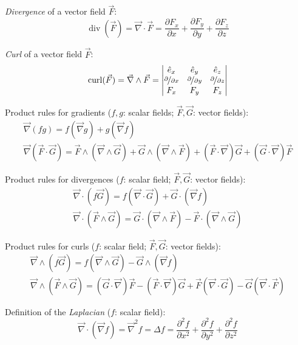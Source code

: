 \documentclass[fontsize=11pt,a4paper]{scrartcl}
\DeclareMathOperator{\Div}{div}
\DeclareMathOperator{\curl}{curl}
\begin{document}
\emph{Divergence} of a vector field $\vec F$:
\[
	\Div(\vec F) = \vec\nabla\cdot\vec F = \frac{\partial F_x}{\partial x}
	                                       + \frac{\partial F_y}{\partial y}
	                                       + \frac{\partial F_z}{\partial z}
\]

\emph{Curl} of a vector field $\vec F$:
\[
	\curl(\vec F) = \vec\nabla\wedge\vec F = \begin{vmatrix}\hat e_x & \hat e_y & \hat e_z\\
	                                                        \nicefrac{\partial}{\partial x} & \nicefrac{\partial}{\partial y} & \nicefrac{\partial}{\partial z}\\
	                                                        F_x & F_y & F_z
	                                         \end{vmatrix}
\]

Product rules for gradients ($f,g$: scalar fields; $\vec F,\vec G$: vector fields):
\begin{gather*}
	\vec\nabla(fg) = f(\vec\nabla g) + g(\vec\nabla f)\\
	\vec\nabla(\vec F\cdot\vec G) = \vec F\wedge(\vec\nabla\wedge\vec G) + \vec G\wedge(\vec\nabla\wedge\vec F)
	                               +(\vec F\cdot\vec\nabla)\vec G + (\vec G\cdot\vec\nabla)\vec F
\end{gather*}

Product rules for divergences ($f$: scalar field; $\vec F,\vec G$: vector fields):
\begin{gather*}
	\vec\nabla\cdot(f\vec G) = f(\vec\nabla\cdot\vec G) + \vec G\cdot(\vec\nabla f)\\
	\vec\nabla\cdot(\vec F\wedge\vec G) = \vec G\cdot(\vec\nabla\wedge\vec F) - \vec F\cdot(\vec\nabla\wedge\vec G)
\end{gather*}

Product rules for curls ($f$: scalar field; $\vec F,\vec G$: vector fields):
\begin{gather*}
	\vec\nabla\wedge(f\vec G) = f(\vec\nabla\wedge\vec G) - \vec G\wedge(\vec\nabla f)\\
	\vec\nabla\wedge(\vec F\wedge\vec G) = (\vec G\cdot\vec\nabla)\vec F - (\vec F\cdot\vec\nabla)\vec G+\vec F(\vec\nabla\cdot\vec G) - \vec G(\vec\nabla\cdot\vec F)
\end{gather*}

Definition of the \emph{Laplacian} ($f$: scalar field):
\[
	\vec\nabla\cdot(\vec\nabla f) = \vec\nabla^2 f = \Delta f = \frac{\partial^2 f}{\partial x^2} + \frac{\partial^2 f}{\partial y^2} + \frac{\partial^2 f}{\partial z^2}
\]
\end{document}
